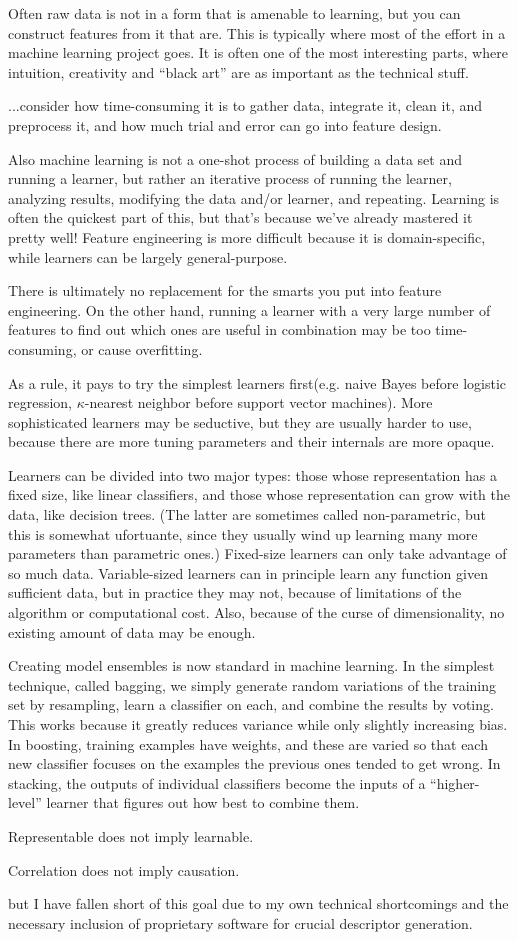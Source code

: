 Often raw data is not in a form that is amenable to learning, but you can construct features from it that are. This is typically where most of the effort in a machine learning project goes. It is often one of the most interesting parts, where intuition, creativity and “black art” are as important as the technical stuff.\cite{Domingos2012}

...consider how time-consuming it is to gather data, integrate it, clean it, and preprocess it, and how much trial and error can go into feature design.\cite{Domingos2012}

Also machine learning is not a one-shot process of building a data set and running a learner, but rather an iterative process of running the learner, analyzing results, modifying the data and/or learner, and repeating. Learning is often the quickest part of this, but that’s because we’ve already mastered it pretty well! Feature engineering is more difficult because it is domain-specific, while learners can be largely general-purpose.\cite{Domingos2012}

There is ultimately no replacement for the smarts you put into feature engineering. On the other hand, running a learner with a very large number of features to find out which ones are useful in combination may be too time-consuming, or cause overfitting.\cite{Domingos2012}

As a rule, it pays to try the simplest learners first(e.g. naive Bayes before logistic regression, $\kappa$-nearest neighbor before support vector machines). More sophisticated learners may be seductive, but they are usually harder to use, because there are more tuning parameters and their internals are more opaque.\cite{Domingos2012}

Learners can be divided into two major types: those whose representation has a fixed size, like linear classifiers, and those whose representation can grow with the data, like decision trees. (The latter are sometimes called non-parametric, but this is somewhat ufortuante, since they usually wind up learning many more parameters than parametric ones.) Fixed-size learners can only take advantage of so much data. Variable-sized learners can in principle learn any function given sufficient data, but in practice they may not, because of limitations of the algorithm or computational cost. Also, because of the curse of dimensionality, no existing amount of data may be enough.\cite{Domingos2012}

Creating model ensembles is now standard in machine learning. In the simplest technique, called bagging, we simply generate random variations of the training set by resampling, learn a classifier on each, and combine the results by voting. This works because it greatly reduces variance while only slightly increasing bias. In boosting, training examples have weights, and these are varied so that each new classifier focuses on the examples the previous ones tended to get wrong. In stacking, the outputs of individual classifiers become the inputs of a “higher-level” learner that figures out how best to combine them.\cite{Domingos2012}

Representable does not imply learnable.\cite{Domingos2012}

Correlation does not imply causation.\cite{Domingos2012}


but I have fallen short of this goal due to my own technical shortcomings and the necessary inclusion of proprietary software for crucial descriptor generation.